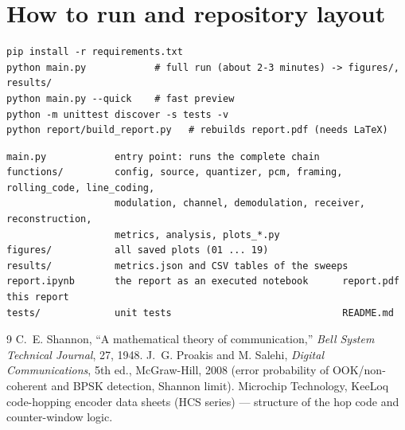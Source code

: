 \documentclass[11pt,a4paper]{article}
\begin{document}
\section*{How to run and repository layout}
\begin{lstlisting}
pip install -r requirements.txt
python main.py            # full run (about 2-3 minutes) -> figures/, results/
python main.py --quick    # fast preview
python -m unittest discover -s tests -v
python report/build_report.py   # rebuilds report.pdf (needs LaTeX)
\end{lstlisting}
\begin{lstlisting}
main.py            entry point: runs the complete chain
functions/         config, source, quantizer, pcm, framing, rolling_code, line_coding,
                   modulation, channel, demodulation, receiver, reconstruction,
                   metrics, analysis, plots_*.py
figures/           all saved plots (01 ... 19)
results/           metrics.json and CSV tables of the sweeps
report.ipynb       the report as an executed notebook      report.pdf   this report
tests/             unit tests                              README.md
\end{lstlisting}

\begin{thebibliography}{9}
 C.~E. Shannon, ``A mathematical theory of communication,'' \emph{Bell System Technical Journal}, 27, 1948.
 J.~G. Proakis and M. Salehi, \emph{Digital Communications}, 5th ed., McGraw-Hill, 2008 (error probability of OOK/non-coherent and BPSK detection, Shannon limit).
 Microchip Technology, KeeLoq code-hopping encoder data sheets (HCS series) --- structure of the hop code and counter-window logic.
\end{thebibliography}
\end{document}
